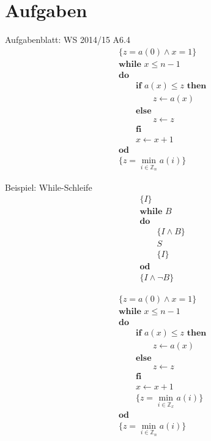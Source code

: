 \section{Aufgaben}

\begin{frame}{Aufgabenblatt: WS 2014/15 A6.4}
  \begin{align*}
    &\{z = a(0) \land x = 1\} \\
    &\textbf{while } x \leq n - 1  \\
    &\textbf{do } \\
    &\qquad \textbf{if } a(x) \leq z \textbf{ then}\\
    &\qquad\qquad z\leftarrow a(x) \\
    &\qquad\textbf{else}\\
    &\qquad\qquad z\leftarrow z \\
    &\qquad\textbf{fi}\\
    &\qquad x\leftarrow x+1 \\
    &\textbf{od } \\
    &\{z = \min_{i \in \mathbb{Z}_n} a(i)\}
  \end{align*}
\end{frame}

\begin{frame}{Beispiel: While-Schleife}
  \begin{align*}
    &\{ I \} \\
    &\textbf{while } B  \\
    &\textbf{do } \\
    &\qquad\{ I\land B \} \\
    &\qquad S \\
    &\qquad\{ I \} \\
    &\textbf{od } \\
    &\{I\land \lnot B\}
  \end{align*}
\end{frame}

\begin{frame}
  \begin{align*}
    &\{z = a(0) \land x = 1\} \\
    &\textbf{while } x \leq n - 1  \\
    &\textbf{do } \\
    &\qquad \textbf{if } a(x) \leq z \textbf{ then}\\
    &\qquad\qquad z\leftarrow a(x) \\
    &\qquad\textbf{else}\\
    &\qquad\qquad z\leftarrow z \\
    &\qquad\textbf{fi}\\
    &\qquad x\leftarrow x+1 \\
    &\qquad \{z = \min_{i \in \mathbb{Z}_{x}} a(i)\} \\
    &\textbf{od } \\
    &\{z = \min_{i \in \mathbb{Z}_n} a(i)\}
  \end{align*}
\end{frame}


